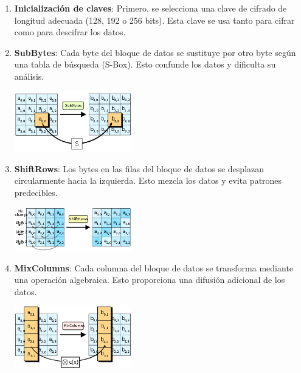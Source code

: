 \documentclass[a4paper, 12pt]{article}
\begin{document}
\begin{enumerate}
\def\labelenumi{\arabic{enumi}.}

\item \textbf{Inicialización de claves}: Primero, se selecciona una clave de cifrado de longitud adecuada (128, 192 o 256 bits). Esta clave se usa tanto para cifrar como para descifrar los datos.

\item \textbf{SubBytes}: Cada byte del bloque de datos se sustituye por otro byte según una tabla de búsqueda (S-Box). Esto confunde los datos y dificulta su análisis.

\begin{center}
	\includegraphics[width=0.4\textwidth]{images/SubBytes.png}
\end{center}

\item \textbf{ShiftRows}: Los bytes en las filas del bloque de datos se desplazan circularmente hacia la izquierda. Esto mezcla los datos y evita patrones predecibles.

\begin{center}
	\includegraphics[width=0.4\textwidth]{images/ShiftRows.png}
\end{center}

\item \textbf{MixColumns}: Cada columna del bloque de datos se transforma mediante una operación algebraica. Esto proporciona una difusión adicional de los datos.

\begin{center}
	\includegraphics[width=0.4\textwidth]{images/MixColumn.png}
\end{center}


\end{enumerate}
\end{document}
